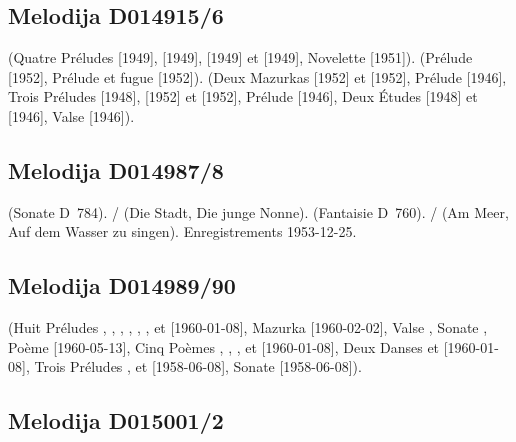 \subsection{Melodija D014915/6}

\Liadov{} (Quatre Préludes   [1949],  
[1949],   [1949] et   [1949],
Novelette  [1951]).
\Glazounov{} (Prélude   [1952], Prélude et fugue
  [1952]).
\Scriabine{} (Deux Mazurkas   [1952] et 
 [1952], Prélude   [1946], Trois Préludes
  [1948],   [1952] et 
 [1952], Prélude   [1946], Deux Études 
 [1948] et   [1946], Valse  [1946]).

\subsection{Melodija D014987/8}

\Schubert{} (Sonate D~784).
\Schubert{}/\Liszt{} (Die Stadt, Die junge Nonne).
\Schubert{} (Fantaisie  D~760).
\Schubert{}/\Liszt{} (Am Meer, Auf dem Wasser zu singen).
Enregistrements 1953-12-25.

\subsection{Melodija D014989/90}

\Scriabine{} (Huit Préludes  ,  ,
 ,  ,  , 
,   et   [1960-01-08],
Mazurka   [1960-02-02], Valse , Sonate
, Poème  [1960-05-13], Cinq Poèmes  ,
 ,  ,   et
  [1960-01-08], Deux Danses   et
  [1960-01-08], Trois Préludes  ,
  et   [1958-06-08], Sonate 
[1958-06-08]).

\subsection{Melodija D015001/2}

